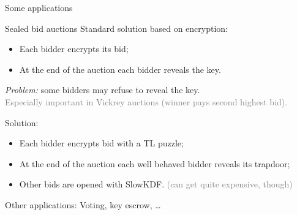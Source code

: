 \documentclass[aspectratio=169]{beamer}
\begin{document}
\begin{frame}{Some applications}
  \begin{block}{Sealed bid auctions}
    Standard solution based on encryption:
    \begin{itemize}
    \item Each bidder encrypts its bid;
    \item At the end of the auction each bidder reveals the key.
    \end{itemize}

    \emph{Problem:} some bidders may refuse to reveal the key.\\
    \textcolor{gray}{Especially important in Vickrey auctions (winner
      pays second highest bid).}

    \bigskip\pause
    Solution:
    \begin{itemize}
    \item Each bidder encrypts bid with a TL puzzle;
    \item At the end of the auction each well behaved bidder reveals
      its trapdoor;
    \item Other bids are opened with SlowKDF. \textcolor{gray}{(can
        get quite expensive, though)}
    \end{itemize}
  \end{block}

  Other applications: Voting, key escrow, \dots
\end{frame}

\end{document}
